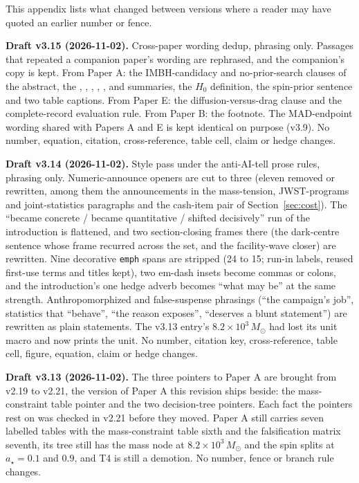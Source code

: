 \documentclass[11pt]{article}
\newcommand{\msun}{\ensuremath{M_\odot}}
\newcommand{\astar}{\ensuremath{a_\star}}
\begin{document}
This appendix lists what changed between versions where a reader may have quoted an earlier number or fence.

\textbf{Draft v3.15 (2026-11-02).} Cross-paper wording dedup, phrasing only. Passages that repeated a companion paper's wording are rephrased, and the companion's copy is kept. From Paper A: the IMBH-candidacy and no-prior-search clauses of the abstract, the \citet{Haberle2024Nature}, \citet{BanaresHernandez2025}, \citet{Mahida2026}, \citet{Chen2025JWST}, \citet{ColomiBernadich2026}, \citet{KM3NeT2025} and \citet{Haggard2013} summaries, the $H_0$ definition, the spin-prior sentence and two table captions. From Paper E: the diffusion-versus-drag clause and the complete-record evaluation rule. From Paper B: the \citet{Garrett2026Slysh} footnote. The MAD-endpoint wording shared with Papers A and E is kept identical on purpose (v3.9). No number, equation, citation, cross-reference, table cell, claim or hedge changes.

\textbf{Draft v3.14 (2026-11-02).} Style pass under the anti-AI-tell prose rules, phrasing only. Numeric-announce openers are cut to three (eleven removed or rewritten, among them the announcements in the mass-tension, JWST-programs and joint-statistics paragraphs and the cash-item pair of Section~\ref{sec:cost}). The ``became concrete / became quantitative / shifted decisively'' run of the introduction is flattened, and two section-closing frames there (the dark-centre sentence whose frame recurred across the set, and the facility-wave closer) are rewritten. Nine decorative \texttt{emph} spans are stripped (24 to 15; run-in labels, reused first-use terms and titles kept), two em-dash insets become commas or colons, and the introduction's one hedge adverb becomes ``what may be'' at the same strength. Anthropomorphized and false-suspense phrasings (``the campaign's job'', statistics that ``behave'', ``the reason exposes'', ``deserves a blunt statement'') are rewritten as plain statements. The v3.13 entry's $8.2\times10^{3}\,\msun$ had lost its unit macro and now prints the unit. No number, citation key, cross-reference, table cell, figure, equation, claim or hedge changes.

\textbf{Draft v3.13 (2026-11-02).} The three pointers to Paper A are brought from v2.19 to v2.21, the version of Paper A this revision ships beside: the mass-constraint table pointer and the two decision-tree pointers. Each fact the pointers rest on was checked in v2.21 before they moved. Paper A still carries seven labelled tables with the mass-constraint table sixth and the falsification matrix seventh, its tree still has the mass node at $8.2\times10^{3}\,\msun$ and the spin splits at $\astar = 0.1$ and $0.9$, and T4 is still a demotion. No number, fence or branch rule changes.
\end{document}
